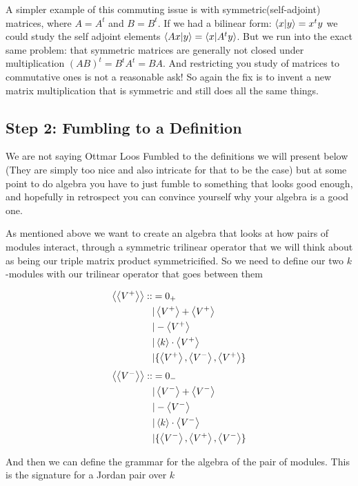 A simpler example of this commuting issue is with symmetric(self-adjoint) matrices, where $A=A^t$ and $B=B^t$. 
If we had a bilinear form: $\left\langle x|y \right\rangle=x^ty$ we could study the self adjoint elements $\left\langle Ax|y \right\rangle=\left\langle x|A^ty \right\rangle$. 
But we run into the exact same problem: that symmetric matrices are generally not closed under multiplication
$(AB)^t=B^tA^t=BA$. And restricting you study of matrices to commutative ones is not a reasonable ask! 
So again the fix is to invent a new matrix multiplication that is symmetric and still does all the same things.


\subsection{Step 2: Fumbling to a Definition}
We are not saying Ottmar Loos Fumbled to the definitions we will present below 
(They are simply too nice and also intricate for that to be the case) but at some point to do
algebra you have to just fumble to something that looks good enough, and hopefully in retrospect you can convince yourself
why your algebra is a good one.

As mentioned above we want to create an algebra that looks at how pairs of modules interact, through a symmetric 
trilinear operator that we will think about as being our triple matrix product symmetricified.
So we need to define our two $k$-modules with our trilinear operator that goes between them

\begin{align*}\left\langle \left\langle V^+ \right\rangle \right\rangle::&= 0_+ \\
                             &| \left\langle V^+ \right\rangle+\left\langle V^+ \right\rangle \\
                             &| -\left\langle V^+ \right\rangle \\
                             &| \left\langle k \right\rangle\cdot \left\langle V^+ \right\rangle\\ 
                             &| \{\left\langle V^+ \right\rangle, \left\langle V^- \right\rangle, \left\langle V^+ \right\rangle\}\end{align*}
\begin{align*}\left\langle \left\langle V^- \right\rangle \right\rangle::&= 0_- \\
    &| \left\langle V^- \right\rangle+\left\langle V^- \right\rangle \\
    &| -\left\langle V^- \right\rangle \\
    &| \left\langle k \right\rangle\cdot \left\langle V^- \right\rangle \\
    &| \{\left\langle V^- \right\rangle, \left\langle V^+ \right\rangle, \left\langle V^- \right\rangle\}\end{align*}
 
And then we can define the grammar for the algebra of the pair of modules. This is the signature for a Jordan pair over $k$


